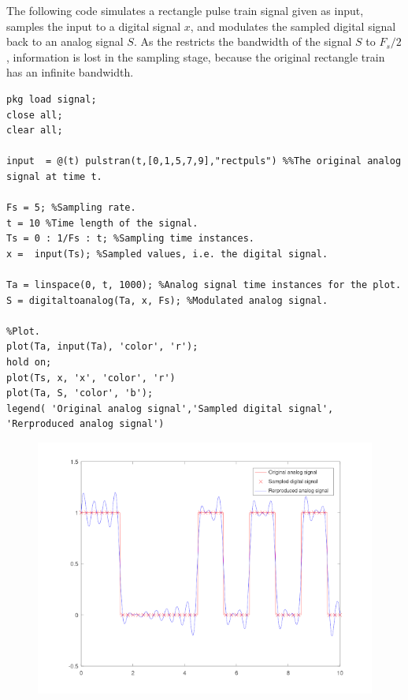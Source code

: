 \documentclass{article}
\begin{document}
The following code simulates a rectangle pulse train signal given as input, samples the input to a digital signal $x$, and modulates the sampled digital signal back to an analog signal $S$. As the  restricts the bandwidth of the signal $S$ to $F_s/2$, information is lost in the sampling stage, because the original rectangle train has an infinite bandwidth.


\begin{verbatim}
pkg load signal;
close all;
clear all;

input  = @(t) pulstran(t,[0,1,5,7,9],"rectpuls") %%The original analog signal at time t.

Fs = 5; %Sampling rate.
t = 10 %Time length of the signal.
Ts = 0 : 1/Fs : t; %Sampling time instances.
x =  input(Ts); %Sampled values, i.e. the digital signal.

Ta = linspace(0, t, 1000); %Analog signal time instances for the plot.
S = digitaltoanalog(Ta, x, Fs); %Modulated analog signal.

%Plot.
plot(Ta, input(Ta), 'color', 'r');
hold on;
plot(Ts, x, 'x', 'color', 'r')
plot(Ta, S, 'color', 'b');
legend( 'Original analog signal','Sampled digital signal', 'Rerproduced analog signal')

\end{verbatim}

\begin{figure}
  \includegraphics[width=\linewidth]{rectangletrain.png}
\end{figure}
\end{document}
